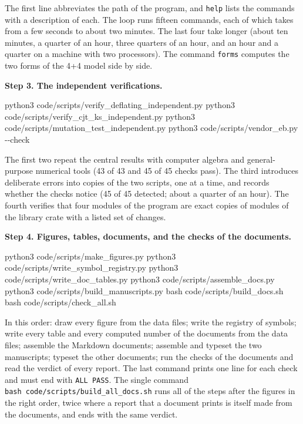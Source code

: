 \documentclass[
  10pt,
]{article}
\newenvironment{Shaded}{}{}
\newcommand{\AttributeTok}[1]{\textcolor[rgb]{0.49,0.56,0.16}{#1}}
\newcommand{\ExtensionTok}[1]{#1}
\newcommand{\FunctionTok}[1]{\textcolor[rgb]{0.02,0.16,0.49}{#1}}
\newcommand{\NormalTok}[1]{#1}
\begin{document}
The first line abbreviates the path of the program, and \texttt{help}
lists the commands with a description of each. The loop runs fifteen
commands, each of which takes from a few seconds to about two minutes.
The last four take longer (about ten minutes, a quarter of an hour,
three quarters of an hour, and an hour and a quarter on a machine with
two processors). The command \texttt{forms} computes the two forms of
the 4+4 model side by side.

\textbf{Step 3. The independent verifications.}

\begin{Shaded}
\begin{Highlighting}[]
\ExtensionTok{python3}\NormalTok{ code/scripts/verify\_deflating\_independent.py}
\ExtensionTok{python3}\NormalTok{ code/scripts/verify\_cjt\_ks\_independent.py}
\ExtensionTok{python3}\NormalTok{ code/scripts/mutation\_test\_independent.py}
\ExtensionTok{python3}\NormalTok{ code/scripts/vendor\_eb.py }\AttributeTok{{-}{-}check}
\end{Highlighting}
\end{Shaded}

The first two repeat the central results with computer algebra and
general-purpose numerical tools (43 of 43 and 45 of 45 checks pass). The
third introduces deliberate errors into copies of the two scripts, one
at a time, and records whether the checks notice (45 of 45 detected;
about a quarter of an hour). The fourth verifies that four modules of
the program are exact copies of modules of the library crate with a
listed set of changes.

\textbf{Step 4. Figures, tables, documents, and the checks of the
documents.}

\begin{Shaded}
\begin{Highlighting}[]
\ExtensionTok{python3}\NormalTok{ code/scripts/make\_figures.py}
\ExtensionTok{python3}\NormalTok{ code/scripts/write\_symbol\_registry.py}
\ExtensionTok{python3}\NormalTok{ code/scripts/write\_doc\_tables.py}
\ExtensionTok{python3}\NormalTok{ code/scripts/assemble\_docs.py}
\ExtensionTok{python3}\NormalTok{ code/scripts/build\_manuscripts.py}
\FunctionTok{bash}\NormalTok{    code/scripts/build\_docs.sh}
\FunctionTok{bash}\NormalTok{    code/scripts/check\_all.sh}
\end{Highlighting}
\end{Shaded}

In this order: draw every figure from the data files; write the registry
of symbols; write every table and every computed number of the documents
from the data files; assemble the Markdown documents; assemble and
typeset the two manuscripts; typeset the other documents; run the checks
of the documents and read the verdict of every report. The last command
prints one line for each check and must end with \texttt{ALL\ PASS}. The
single command \texttt{bash\ code/scripts/build\_all\_docs.sh} runs all
of the steps after the figures in the right order, twice where a report
that a document prints is itself made from the documents, and ends with
the same verdict.
\end{document}
